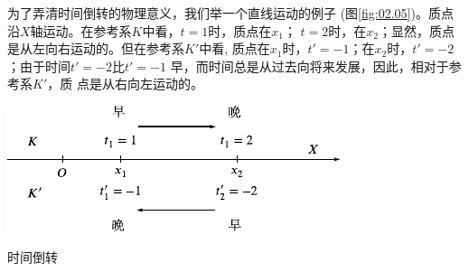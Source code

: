 为了弄清时间倒转的物理意义，我们举一个直线运动的例子
(图\ref{fig:02.05})。质点沿$X$轴运动。在参考系$K$中看，$t=1$时，质点在$x_1$；
$t=2$时，在$x_2$；显然，质点是从左向右运动的。但在参考系$K'$中看,
质点在$x_1$时，$t'=-1$；在$x_2$时，$t'=-2$；由于时间$t'=-2$比$t'=-1$
早，而时间总是从过去向将来发展，因此，相对于参考系$K'$，质
点是从右向左运动的。
\begin{figurex}
  \centering
  \includegraphics{figure/fig02.05}
  \caption{时间倒转}
  \label{fig:02.05}
\end{figurex}
